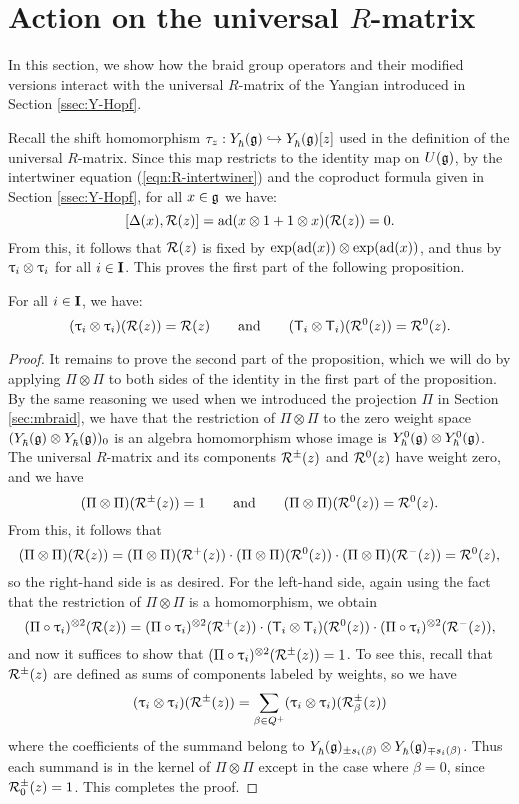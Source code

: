 \section{Action on the universal \texorpdfstring{$R$}{R}-matrix}

In this section, we show how the braid group operators and their modified versions interact with the universal $R$-matrix of the Yangian introduced in Section \ref{ssec:Y-Hopf}.

Recall the shift homomorphism $\tau_z:\Yhg\inj\Yhg[][z]$ used in the definition of the universal $R$-matrix.
Since this map restricts to the identity map on $\Ug$, by the intertwiner equation (\ref{eqn:R-intertwiner}) and the coproduct formula given in Section \ref{ssec:Y-Hopf}, for all $x\in\g$ we have:
\[[\Delta(x), \rmat(z)] = \ad(x\otimes 1 + 1\otimes x)(\rmat(z)) = 0.\]
From this, it follows that $\rmat(z)$ is fixed by $\exp(\ad(x))\otimes\exp(\ad(x))$, and thus by $\braid_i\otimes\braid_i$ for all $i\in\I$.
This proves the first part of the following proposition.

\begin{proposition}\label{P:braid-R}
    For all $i\in\I$, we have:
    \[(\braid_i\otimes\braid_i)(\rmat(z)) = \rmat(z) \qquad\text{and}\qquad (\mbraid_i\otimes\mbraid_i)(\rmat^0(z)) = \rmat^0(z).\]
\end{proposition}
\begin{proof}
    It remains to prove the second part of the proposition, which we will do by applying $\Pi\otimes\Pi$ to both sides of the identity in the first part of the proposition.
    By the same reasoning we used when we introduced the projection $\Pi$ in Section \ref{sec:mbraid}, we have that the restriction of $\Pi\otimes\Pi$ to the zero weight space $(\Yhg\otimes\Yhg)_0$ is an algebra homomorphism whose image is $\Yhg[0]\otimes\Yhg[0]$.
    The universal $R$-matrix and its components $\rmat^\pm(z)$ and $\rmat^0(z)$ have weight zero, and we have
    \[(\Pi\otimes\Pi)(\rmat^\pm(z)) = 1 \qquad\text{and}\qquad (\Pi\otimes\Pi)(\rmat^0(z)) = \rmat^0(z).\]
    From this, it follows that
    \[(\Pi\otimes\Pi)(\rmat(z)) = (\Pi\otimes\Pi)(\rmat^+(z)) \cdot (\Pi\otimes\Pi)(\rmat^0(z)) \cdot (\Pi\otimes\Pi)(\rmat^-(z)) = \rmat^0(z),\]
    so the right-hand side is as desired.
    For the left-hand side, again using the fact that the restriction of $\Pi\otimes\Pi$ is a homomorphism, we obtain
    \[(\Pi\circ\braid_i)^{\otimes 2}(\rmat(z)) = (\Pi\circ\braid_i)^{\otimes 2}(\rmat^+(z)) \cdot (\mbraid_i\otimes\mbraid_i)(\rmat^0(z)) \cdot (\Pi\circ\braid_i)^{\otimes 2}(\rmat^-(z)),\]
    and now it suffices to show that $(\Pi\circ\braid_i)^{\otimes 2}(\rmat^\pm(z))=1$.
    To see this, recall that $\rmat^\pm(z)$ are defined as sums of components labeled by weights, so we have
    \[(\braid_i\otimes\braid_i)(\rmat^\pm(z)) = \sum_{\beta\in Q^+}(\braid_i\otimes\braid_i)(\rmat_\beta^\pm(z))\]
    where the coefficients of the summand belong to $\Yhg_{\pm s_i(\beta)}\otimes\Yhg_{\mp s_i(\beta)}$.
    Thus each summand is in the kernel of $\Pi\otimes\Pi$ except in the case where $\beta=0$, since $\rmat_0^\pm(z)=1$.
    This completes the proof.
\end{proof}
